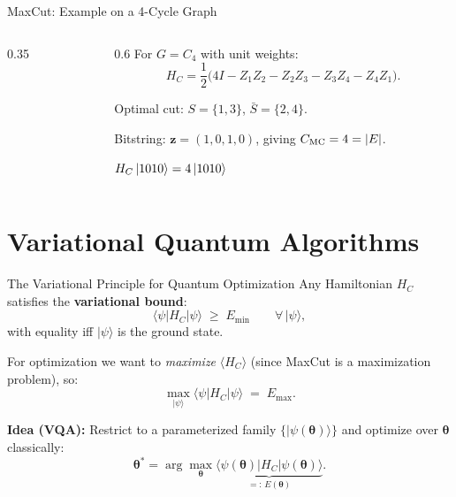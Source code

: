 \documentclass{beamer}
\begin{document}
\begin{frame}{MaxCut: Example on a 4-Cycle Graph}
\begin{columns}
\begin{column}{0.35\textwidth}
\centering
{}
\end{column}
\begin{column}{0.6\textwidth}
For $G = C_4$ with unit weights:
\[
H_C = \frac{1}{2}
\bigl(
4I - Z_1Z_2 - Z_2Z_3 - Z_3Z_4 - Z_4Z_1
\bigr).
\]

Optimal cut: $S=\{1,3\}$, $\bar S=\{2,4\}$.

Bitstring: $\mathbf{z}=(1,0,1,0)$, giving $C_{\rm MC}=4=|E|$.

\medskip
$H_C\ket{1010} = 4\ket{1010}$ \checkmark
\end{column}
\end{columns}
\end{frame}


\section{Variational Quantum Algorithms}

\begin{frame}{The Variational Principle for Quantum Optimization}
Any Hamiltonian $H_C$ satisfies the \textbf{variational bound}:
\[
\langle\psi|H_C|\psi\rangle \;\ge\; E_{\min}
\qquad\forall\,|\psi\rangle,
\]
with equality iff $|\psi\rangle$ is the ground state.

\medskip

For optimization we want to \emph{maximize} $\langle H_C \rangle$
(since MaxCut is a maximization problem), so:
\[
\max_{|\psi\rangle}\langle\psi|H_C|\psi\rangle \;=\; E_{\max}.
\]

\textbf{Idea (VQA):} Restrict to a parameterized family
$\{|\psi(\boldsymbol{\theta})\rangle\}$
and optimize over $\boldsymbol{\theta}$ classically:
\[
\boldsymbol{\theta}^* = \arg\max_{\boldsymbol{\theta}}
\underbrace{\langle\psi(\boldsymbol{\theta})|H_C|\psi(\boldsymbol{\theta})\rangle}_{=:\,E(\boldsymbol{\theta})}.
\]
\end{frame}
\end{document}
